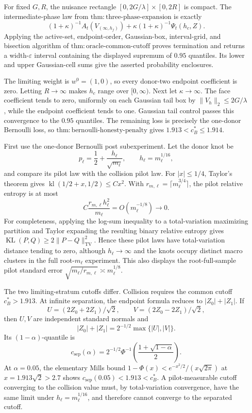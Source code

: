 For fixed \(G,R\), the nuisance rectangle
\([0,2G/\lambda]\times[0,2R]\) is compact.  The intermediate-phase law from
\(\mathrm{thm:three\mbox{-}phase\mbox{-}expansion}\) is exactly
\[
 (1+\kappa)^{-1}A_t(V_{(\infty,h_f)})
 +\kappa(1+\kappa)^{-1}\Psi_t(h_c,Z).
\]
Applying the active-set, endpoint-order, Gaussian-box, interval-grid, and bisection algorithm of \(\mathrm{thm:oracle\mbox{-}common\mbox{-}cutoff}\) proves termination and returns a width-\(\varepsilon\) interval containing the displayed supremum of \(0.95\) quantiles.  Its lower and upper Gaussian-cell sums give the asserted probability enclosures.

The limiting weight is \(w^0=(1,0)\), so every donor-two endpoint coefficient is zero.  Letting \(R\to\infty\) makes \(h_c\) range over \([0,\infty)\).  Next let \(\kappa\to\infty\).  The face coefficient tends to zero, uniformly on each Gaussian tail box by \(\|V_h\|_2\leq2G/\lambda\), while the endpoint coefficient tends to one.  Gaussian tail control passes this convergence to the \(0.95\) quantiles.  The remaining loss is precisely the one-donor Bernoulli loss, so \(\mathrm{thm:bernoulli\mbox{-}honesty\mbox{-}penalty}\) gives
\(1.913<c_B^*\leq1.914\).

First use the one-donor Bernoulli post subexperiment.  Let the donor knot be
\[
 p_\ell=\frac12+\frac{h_\ell}{\sqrt{m_\ell}},
 \qquad h_\ell=m_\ell^{1/16},
\]
and compare its pilot law with the collision pilot law.  For \(|x|\leq1/4\), Taylor's theorem gives
\(\operatorname{kl}(1/2+x,1/2)\leq Cx^2\).  With
\(r_{m,\ell}=\lceil m_\ell^{3/4}\rceil\), the pilot relative entropy is at most
\[
 C\frac{r_{m,\ell}h_\ell^2}{m_\ell}
 =O(m_\ell^{-1/8})\longrightarrow0.
\]
For completeness, applying the log-sum inequality to a total-variation maximizing partition and Taylor expanding the resulting binary relative entropy gives
\(\operatorname{KL}(P,Q)\geq2\|P-Q\|_{\mathrm{TV}}^2\).  Hence these pilot laws have total-variation distance tending to zero, although \(h_\ell\to\infty\) and the knots occupy distinct macro clusters in the full root-\(m_\ell\) experiment.  This also displays the root-full-sample pilot standard error
\(\sqrt{m_\ell/r_{m,\ell}}\asymp m_\ell^{1/8}\).

The two limiting-stratum cutoffs differ.  Collision requires the common cutoff \(c_B^*>1.913\).  At infinite separation, the endpoint formula reduces to \(|Z_0|+|Z_1|\).  If
\[
 U=(2Z_0+2Z_1)/\sqrt2,\qquad V=(2Z_0-2Z_1)/\sqrt2,
\]
then \(U,V\) are independent standard normals and
\[
 |Z_0|+|Z_1|=2^{-1/2}\max\{|U|,|V|\}.
\]
Its \((1-\alpha)\)-quantile is
\[
 c_{\mathrm{sep}}(\alpha)=2^{-1/2}
 \Phi^{-1}\left(\frac{1+\sqrt{1-\alpha}}2\right).
\]
At \(\alpha=0.05\), the elementary Mills bound
\(1-\Phi(x)<e^{-x^2/2}/(x\sqrt{2\pi})\) at
\(x=1.913\sqrt2>2.7\) shows
\(c_{\mathrm{sep}}(0.05)<1.913<c_B^*\).  A pilot-measurable cutoff converging to the collision value must, by total-variation convergence, have the same limit under \(h_\ell=m_\ell^{1/16}\), and therefore cannot converge to the separated cutoff.

